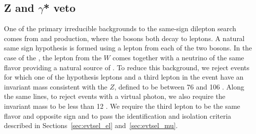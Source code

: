 \subsection{Z and $\gamma$* veto}
\label{sec:evtsel_zveto}
One of the primary irreducible backgrounds to the same-sign dilepton search
comes from \WZ and \ZZ production, where the bosons both decay to leptons.
A natural same sign hypothesis is formed using a lepton from each of the
two bosons. In the case of the \WZ, the lepton from the $W$ comes together
with a neutrino of the same flavor providing a natural source of \met. To
reduce this background, we reject events for which one of the hypothesis
leptons and a third lepton in the event have an invariant mass consistent
with the $Z$, defined to be between 76 and 106 \GeV. Along the same lines, to
reject events with a virtual photon, we also require the invariant mass to
be less than 12 \GeV. We require the third lepton to be the same flavor and
opposite sign and to pass the identification and isolation criteria described
in Sections~\ref{sec:evtsel_el} and~\ref{sec:evtsel_mu}.

